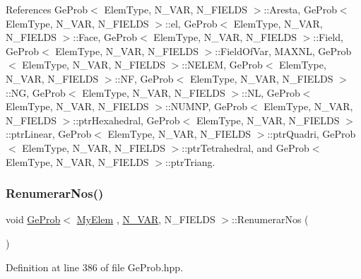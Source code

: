 References Ge\+Prob$<$ Elem\+Type, N\+\_\+\+V\+A\+R, N\+\_\+\+F\+I\+E\+L\+D\+S $>$\+::\+Aresta, Ge\+Prob$<$ Elem\+Type, N\+\_\+\+V\+A\+R, N\+\_\+\+F\+I\+E\+L\+D\+S $>$\+::el, Ge\+Prob$<$ Elem\+Type, N\+\_\+\+V\+A\+R, N\+\_\+\+F\+I\+E\+L\+D\+S $>$\+::\+Face, Ge\+Prob$<$ Elem\+Type, N\+\_\+\+V\+A\+R, N\+\_\+\+F\+I\+E\+L\+D\+S $>$\+::\+Field, Ge\+Prob$<$ Elem\+Type, N\+\_\+\+V\+A\+R, N\+\_\+\+F\+I\+E\+L\+D\+S $>$\+::\+Field\+Of\+Var, M\+A\+X\+NL, Ge\+Prob$<$ Elem\+Type, N\+\_\+\+V\+A\+R, N\+\_\+\+F\+I\+E\+L\+D\+S $>$\+::\+N\+E\+L\+EM, Ge\+Prob$<$ Elem\+Type, N\+\_\+\+V\+A\+R, N\+\_\+\+F\+I\+E\+L\+D\+S $>$\+::\+NF, Ge\+Prob$<$ Elem\+Type, N\+\_\+\+V\+A\+R, N\+\_\+\+F\+I\+E\+L\+D\+S $>$\+::\+NG, Ge\+Prob$<$ Elem\+Type, N\+\_\+\+V\+A\+R, N\+\_\+\+F\+I\+E\+L\+D\+S $>$\+::\+NL, Ge\+Prob$<$ Elem\+Type, N\+\_\+\+V\+A\+R, N\+\_\+\+F\+I\+E\+L\+D\+S $>$\+::\+N\+U\+M\+NP, Ge\+Prob$<$ Elem\+Type, N\+\_\+\+V\+A\+R, N\+\_\+\+F\+I\+E\+L\+D\+S $>$\+::ptr\+Hexahedral, Ge\+Prob$<$ Elem\+Type, N\+\_\+\+V\+A\+R, N\+\_\+\+F\+I\+E\+L\+D\+S $>$\+::ptr\+Linear, Ge\+Prob$<$ Elem\+Type, N\+\_\+\+V\+A\+R, N\+\_\+\+F\+I\+E\+L\+D\+S $>$\+::ptr\+Quadri, Ge\+Prob$<$ Elem\+Type, N\+\_\+\+V\+A\+R, N\+\_\+\+F\+I\+E\+L\+D\+S $>$\+::ptr\+Tetrahedral, and Ge\+Prob$<$ Elem\+Type, N\+\_\+\+V\+A\+R, N\+\_\+\+F\+I\+E\+L\+D\+S $>$\+::ptr\+Triang.

\mbox{\label{classGeProb_a18cfc81b7accb83b55b9e69d2738c5de}} 
\subsubsection{\texorpdfstring{Renumerar\+Nos()}{RenumerarNos()}\hspace{0.1cm}{\footnotesize\ttfamily [1/2]}}
{\footnotesize\ttfamily void \hyperlink{classGeProb}{Ge\+Prob}$<$ \hyperlink{DG__Prob_8h_a83cd887ced9a6587428f267e50cd4787}{My\+Elem} , \hyperlink{classED__Prob_a4e7d2ff1a8e435e336fb00c527224b5a}{N\+\_\+\+V\+AR}, N\+\_\+\+F\+I\+E\+L\+DS $>$\+::Renumerar\+Nos (\begin{DoxyParamCaption}{ }\end{DoxyParamCaption})\hspace{0.3cm}{\ttfamily [inherited]}}



Definition at line 386 of file Ge\+Prob.\+hpp.



